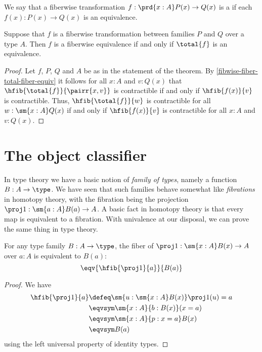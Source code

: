 We say that a fiberwise transformation $f:\prd{x:A} P(x)\to Q(x)$ is a %
%
if each $f(x):P(x) \to Q(x)$ is an equivalence.

\begin{thm}\label{thm:total-fiber-equiv}
Suppose that $f$ is a fiberwise transformation between families
$P$ and $Q$ over a type $A$.
Then $f$ is a fiberwise equivalence if and only if $\total{f}$ is an equivalence.
\end{thm}

\begin{proof}
Let $f$, $P$, $Q$ and $A$ be as in the statement of the theorem.
By \cref{fibwise-fiber-total-fiber-equiv} it follows for all
$x:A$ and $v:Q(x)$ that
$\hfib{\total{f}}{\pairr{x,v}}$ is contractible if and only if
$\hfib{f(x)}{v}$ is contractible.
Thus, $\hfib{\total{f}}{w}$ is contractible for all $w:\sm{x:A}Q(x)$ if and only if $\hfib{f(x)}{v}$ is contractible for all $x:A$ and $v:Q(x)$.
\end{proof}

%


\section{The object classifier}
\label{sec:object-classification}

In type theory we have a basic notion of \emph{family of types}, namely a function $B:A\to\type$.
We have seen that such families behave somewhat like \emph{fibrations} in homotopy theory, with the fibration being the projection $\proj1:\sm{a:A} B(a) \to A$.
A basic fact in homotopy theory is that every map is equivalent to a fibration.
With univalence at our disposal, we can prove the same thing in type theory.

\begin{lem}\label{thm:fiber-of-a-fibration}
  For any type family $B:A\to\type$, the fiber of $\proj1:\sm{x:A} B(x) \to A$ over $a:A$ is equivalent to $B(a)$:
  \[ \eqv{\hfib{\proj1}{a}}{B(a)} \]
\end{lem}
\begin{proof}
  We have
  \begin{align*}
    \hfib{\proj1}{a} &\defeq \sm{u:\sm{x:A} B(x)} \proj1(u)=a\\
    &\eqvsym \sm{x:A}{b:B(x)} (x=a)\\
    &\eqvsym \sm{x:A}{p:x=a} B(x)\\
    &\eqvsym B(a)
  \end{align*}
  using the left universal property of identity types.
\end{proof}

